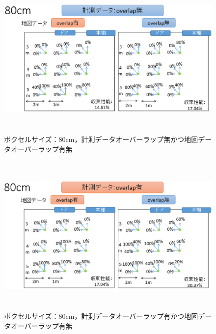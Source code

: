 %
\begin{figure}[htbp]
  \begin{center}
   \includegraphics[height=80mm]{figure/無有無.eps}
   \caption{ボクセルサイズ：80cm，計測データオーバーラップ無かつ地図データオーバーラップ有無}
   \label{80-0}
  \end{center}
\end{figure}
%

%
\begin{figure}[htbp]
  \begin{center}
   \includegraphics[height=80mm]{figure/有有無.eps}
   \caption{ボクセルサイズ：80cm，計測データオーバーラップ有かつ地図データオーバーラップ有無}
   \label{80-1}
  \end{center}
\end{figure}
%



